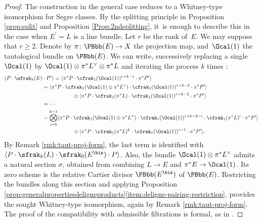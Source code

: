 \begin{proof}
The construction in the general case reduces to a Whitney-type isomorphism for Segre classes. By the splitting principle in Proposition \ref{prop:split} and Proposition \ref{Prop:2ndsplitting}, it~is enough to describe this in the case when $E^{\prime}=L$ is a line bundle. Let $r$ be the rank of~$E$. We may suppose that $r\geq 2$. Denote by $\pi\colon\PBbb(E)\to X$ the projection map, and~$\Ocal(1)$ the tautological bundle on $\PBbb(E)$. We can write, successively replacing a single~$\Ocal(1)$ by $\Ocal(1) \otimes \pi^{\ast} L^{\vee} \otimes \pi^\ast L $ and iterating the process $k$ times :
\begin{equation}\label{eq:SegreWhitney}
\begin{split}
\langle P \cdot \sfrak_k(E) &{}\cdot P' \rangle = \langle \pi^{\ast}P\cdot \cfrak_1(\Ocal(1))^{r+k-1} \cdot \pi^{\ast}P' \rangle \\
&= \langle \pi^{\ast}P\cdot \cfrak_1(\Ocal(1) \otimes \pi^{\ast}L^\vee) \cdot \cfrak_1(\Ocal(1))^{r+k-2}\cdot \pi^{\ast}P' \rangle\\
&\hspace*{2cm}\otimes \langle \pi^{\ast}P\cdot \cfrak_1(\pi^{\ast}L)\cdot\cfrak_1(\Ocal(1))^{r+k-2} \cdot \pi^{\ast}P' \rangle \\
&=\cdots\\
&= \bigotimes_{i=0}^{k-1} \langle \pi^{\ast}P \cdot \cfrak_1(\Ocal(1) \otimes \pi^{\ast} L^\vee) \cdot \cfrak_1(\Ocal(1))^{r+k-2-i} \cdot \cfrak_1(\pi^\ast L)^{i} \cdot \pi^{\ast}P'\rangle \\
&\hspace*{2cm}\otimes \langle \pi^{\ast}P \cdot \cfrak_1(\pi^\ast L)^{k} \cdot \cfrak_1(\Ocal(1))^{r-1} \cdot \pi^{\ast}P'\rangle.
\end{split}
\end{equation}
By Remark \ref{rmk:taut-proj-form}, the last term is identified with $\langle P \cdot \sfrak_k(L) \cdot \sfrak_0(E^{\bis}) \cdot P \rangle$. Also, the bundle $\Ocal(1) \otimes \pi^\ast L^\vee$ admits a natural section $\sigma$, obtained from combining $L \to E$ and $\pi^\ast E \to \Ocal(1)$. Its zero scheme is the relative Cartier divisor $\PBbb(E^{\bis})$ of $\PBbb(E)$. Restricting the bundles along this section and applying Proposition \ref{prop:generalpropertiesdeligneproducts}\eqref{item:deligne-pairing-restriction}, provides the sought Whitney-type isomorphism, again by Remark \ref{rmk:taut-proj-form}. The proof of the compatibility with admissible filtrations is formal, as in \cite[\textsection V.2.3]{Elkikfib}.


\end{proof}
